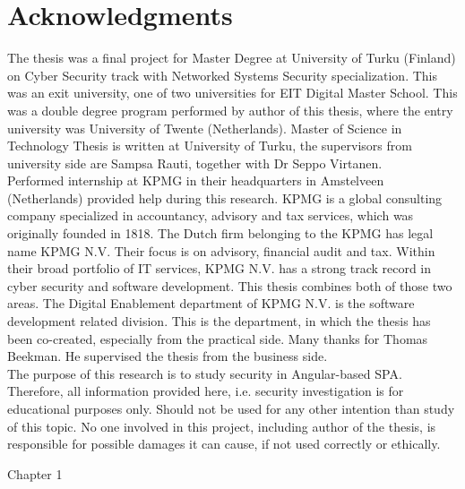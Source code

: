 \documentclass{article} %
\begin{document}
\section*{Acknowledgments}
\justifying The thesis was a final project for Master Degree at University of Turku (Finland) on Cyber Security track with Networked Systems Security specialization. This was an exit university, one of two universities for EIT Digital Master School. This was a double degree program performed by author of this thesis, where the entry university was University of Twente (Netherlands). Master of Science in Technology Thesis is written at University of Turku, the supervisors from university side are Sampsa Rauti, together with Dr Seppo Virtanen.\\
\newline
Performed internship at KPMG in their headquarters in Amstelveen (Netherlands) provided help during this research. KPMG is a global consulting company specialized in accountancy, advisory and tax services, which was originally founded in 1818. The Dutch firm belonging to the KPMG has legal name KPMG N.V. Their focus is on advisory, financial audit and tax. Within their broad portfolio of IT services, KPMG N.V. has a strong track record in cyber security and software development. This thesis combines both of those two areas. The Digital Enablement department of KPMG N.V. is the software development related division. This is the department, in which the thesis has been co-created, especially from the practical side. Many thanks for Thomas Beekman. He supervised the thesis from the business side.\\
\newline
The purpose of this research is to study security in Angular-based SPA. Therefore, all information provided here, i.e. security investigation is for educational purposes only. Should not be used for any other intention than study of this topic. No one involved in this project, including author of the thesis, is responsible for possible damages it can cause, if not used correctly or ethically.
\newpage
\tableofcontents
\newpage
{}
\listoffigures
{}
\newpage
{}
\listoftables
{}
\newpage
{}
\lstlistoflistings

\newpage
{} %
\huge Chapter 1
\end{document}

